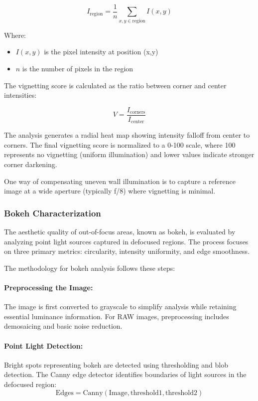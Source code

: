 \begin{equation}
I_{\text{region}} = \frac{1}{n} \sum_{x,y \in \text{region}} I(x,y)
\end{equation}

Where:
\begin{itemize}
    \item \( I(x,y) \) is the pixel intensity at position (x,y)
    \item \( n \) is the number of pixels in the region
\end{itemize}

The vignetting score is calculated as the ratio between corner and center intensities:

\begin{equation}
V = \frac{I_{\text{corners}}}{I_{\text{center}}}
\end{equation}

The analysis generates a radial heat map showing intensity falloff from center to corners. The final vignetting score is normalized to a 0-100 scale, where 100 represents no vignetting (uniform illumination) and lower values indicate stronger corner darkening.

One way of compensating uneven wall illumination is to capture a reference image at a wide aperture (typically f/8) where vignetting is minimal.
\subsubsection{Bokeh Characterization}
The aesthetic quality of out-of-focus areas, known as bokeh, is evaluated by analyzing point light sources captured in defocused regions. The process focuses on three primary metrics: circularity, intensity uniformity, and edge smoothness.

The methodology for bokeh analysis follows these steps:

\paragraph{Preprocessing the Image:}
The image is first converted to grayscale to simplify analysis while retaining essential luminance information. For RAW images, preprocessing includes demosaicing and basic noise reduction.

\paragraph{Point Light Detection:}
Bright spots representing bokeh are detected using thresholding and blob detection. The Canny edge detector identifies boundaries of light sources in the defocused region:
\[
\text{Edges} = \text{Canny}(\text{Image}, \text{threshold1}, \text{threshold2})
\]

